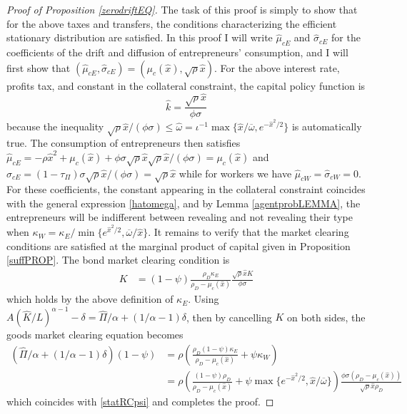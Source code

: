 \documentclass[11pt]{article}
\theoremstyle{plain}
\theoremstyle{definition} %
\begin{document}
\begin{proof}[Proof of Proposition \ref{zerodriftEQ}]
The task of this proof is simply to show that for the above taxes and transfers, the conditions characterizing the efficient stationary distribution are satisfied. In this proof I will write $\hat{\mu}_{cE}$ and $\hat{\sigma}_{cE}$ for the coefficients of the drift and diffusion of entrepreneurs' consumption, and I will first show that $(\hat{\mu}_{cE}, \hat{\sigma}_{cE}) = (\mu_c(\hat{x}), \sqrt{\rho} \hat{x})$. For the above interest rate, profits tax, and constant in the collateral constraint, the capital policy function is
$$%
\hat{k} = \frac{\sqrt{\rho}\hat{x}}{\phi\sigma}
$$%
because the inequality $\sqrt{\rho}\hat{x}/(\phi\sigma) \leq \hat{\omega} = \iota^{-1}\max\{\hat{x}/\overline{\omega}, e^{-\hat{x}^2/2}\}$ is automatically true. The consumption of entrepreneurs then satisfies $\hat{\mu}_{cE} = - \rho \hat{x}^2 + \mu_c(\hat{x}) + \phi \sigma \sqrt{\rho} \hat{x} \sqrt{\rho}\hat{x}/(\phi\sigma) = \mu_c(\hat{x})$ and $\hat{\sigma}_{cE} = (1-\tau_{\Pi})\sigma \sqrt{\rho}\hat{x}/(\phi\sigma) = \sqrt{\rho}\hat{x}$ while for workers we have $\hat{\mu}_{cW} = \hat{\sigma}_{cW} = 0$. For these coefficients, the constant appearing in the collateral constraint coincides with the general expression \eqref{hatomega}, and by Lemma \ref{agentprobLEMMA}, the entrepreneurs will be indifferent between revealing and not revealing their type when $\kappa_W = \kappa_E/\min\{e^{\hat{x}^2/2}, \overline{\omega}/\hat{x}\}$. It remains to verify that the market clearing conditions are satisfied at the marginal product of capital given in Proposition \ref{suffPROP}. The bond market clearing condition is 
\begin{align*}
K & = (1-\psi) \frac{\rho_D \kappa_E}{\rho_D - \mu_c(\hat{x})} \frac{\sqrt{\rho} \hat{x} K}{\phi\sigma}
\end{align*} 
which holds by the above definition of $\kappa_E$. Using $A(\hat{K}/L)^{\alpha-1} - \delta = \hat{\Pi}/\alpha + (1/\alpha-1)\delta$, then by cancelling $K$ on both sides, the goods market clearing equation becomes
\begin{align*}
(\hat{\Pi}/\alpha + (1/\alpha-1)\delta)(1-\psi) & = \rho{\left(\frac{\rho_D(1-\psi)\kappa_E}{\rho_D - \mu_c(\hat{x})} + \psi \kappa_W\right)} 
\\ & = \rho{\left(\frac{(1-\psi) \rho_D}{\rho_D - \mu_c(\hat{x})} + \psi \max\{e^{-\hat{x}^2/2}, \hat{x}/\overline{\omega}\}\right)} \frac{\phi \sigma (\rho_D - \mu_c(\hat{x}))}{\sqrt{\rho} \hat{x} \rho_D}
\end{align*} 
which coincides with \eqref{statRCpsi} and completes the proof. 
\end{proof} 
\end{document}
